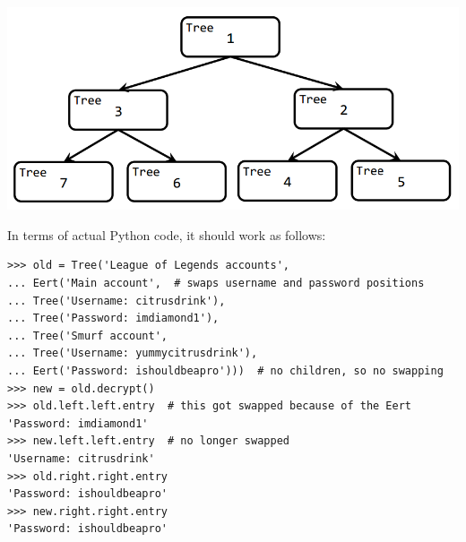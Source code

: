 \begin{parts}
\begin{minipage}{0.5\linewidth}
\includegraphics[width=\linewidth]{decrypted.png}
\end{minipage}

In terms of actual Python code, it should work as follows:

\begin{lstlisting}
>>> old = Tree('League of Legends accounts',
... Eert('Main account',  # swaps username and password positions
... Tree('Username: citrusdrink'),
... Tree('Password: imdiamond1'),
... Tree('Smurf account',
... Tree('Username: yummycitrusdrink'),
... Eert('Password: ishouldbeapro')))  # no children, so no swapping
>>> new = old.decrypt()
>>> old.left.left.entry  # this got swapped because of the Eert
'Password: imdiamond1'
>>> new.left.left.entry  # no longer swapped
'Username: citrusdrink'
>>> old.right.right.entry
'Password: ishouldbeapro'
>>> new.right.right.entry
'Password: ishouldbeapro'
\end{lstlisting}
\end{parts}
